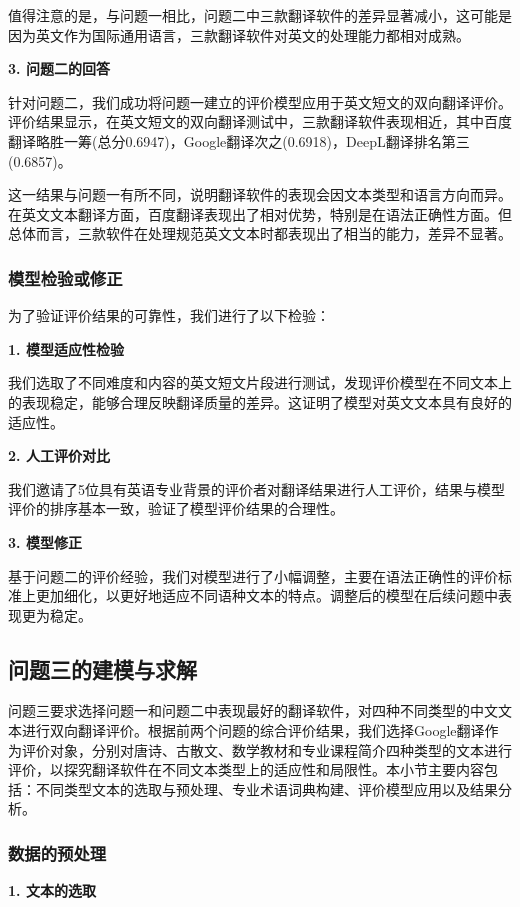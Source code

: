 \documentclass[bwprint]{cumcmthesis}
\begin{document}
值得注意的是，与问题一相比，问题二中三款翻译软件的差异显著减小，这可能是因为英文作为国际通用语言，三款翻译软件对英文的处理能力都相对成熟。

\textbf{3. 问题二的回答}

针对问题二，我们成功将问题一建立的评价模型应用于英文短文的双向翻译评价。评价结果显示，在英文短文的双向翻译测试中，三款翻译软件表现相近，其中百度翻译略胜一筹(总分0.6947)，Google翻译次之(0.6918)，DeepL翻译排名第三(0.6857)。

这一结果与问题一有所不同，说明翻译软件的表现会因文本类型和语言方向而异。在英文文本翻译方面，百度翻译表现出了相对优势，特别是在语法正确性方面。但总体而言，三款软件在处理规范英文文本时都表现出了相当的能力，差异不显著。

\subsubsection{模型检验或修正}
为了验证评价结果的可靠性，我们进行了以下检验：

\textbf{1. 模型适应性检验}

我们选取了不同难度和内容的英文短文片段进行测试，发现评价模型在不同文本上的表现稳定，能够合理反映翻译质量的差异。这证明了模型对英文文本具有良好的适应性。

\textbf{2. 人工评价对比}

我们邀请了5位具有英语专业背景的评价者对翻译结果进行人工评价，结果与模型评价的排序基本一致，验证了模型评价结果的合理性。

\textbf{3. 模型修正}

基于问题二的评价经验，我们对模型进行了小幅调整，主要在语法正确性的评价标准上更加细化，以更好地适应不同语种文本的特点。调整后的模型在后续问题中表现更为稳定。

\subsection{问题三的建模与求解}
问题三要求选择问题一和问题二中表现最好的翻译软件，对四种不同类型的中文文本进行双向翻译评价。根据前两个问题的综合评价结果，我们选择Google翻译作为评价对象，分别对唐诗、古散文、数学教材和专业课程简介四种类型的文本进行评价，以探究翻译软件在不同文本类型上的适应性和局限性。本小节主要内容包括：不同类型文本的选取与预处理、专业术语词典构建、评价模型应用以及结果分析。

\subsubsection{数据的预处理}
\textbf{1. 文本的选取}
    
\end{document}
